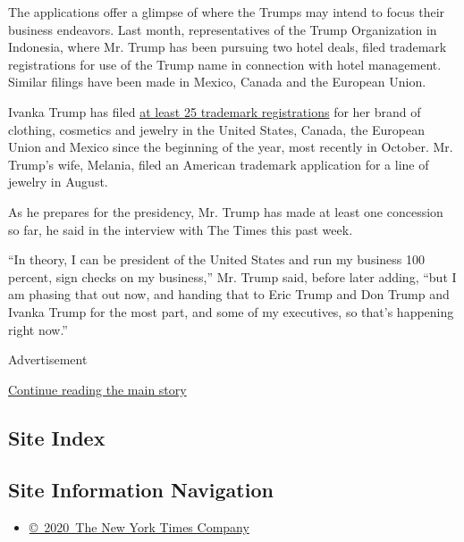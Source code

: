 The applications offer a glimpse of where the Trumps may intend to focus
their business endeavors. Last month, representatives of the Trump
Organization in Indonesia, where Mr. Trump has been pursuing two hotel
deals, filed trademark registrations for use of the Trump name in
connection with hotel management. Similar filings have been made in
Mexico, Canada and the European Union.

Ivanka Trump has filed
\href{https://trademarks.justia.com/owners/ivanka-trump-marks-llc-1365461/}{at
least 25 trademark registrations} for her brand of clothing, cosmetics
and jewelry in the United States, Canada, the European Union and Mexico
since the beginning of the year, most recently in October. Mr. Trump's
wife, Melania, filed an American trademark application for a line of
jewelry in August.

As he prepares for the presidency, Mr. Trump has made at least one
concession so far, he said in the interview with The Times this past
week.

``In theory, I can be president of the United States and run my business
100 percent, sign checks on my business,'' Mr. Trump said, before later
adding, ``but I am phasing that out now, and handing that to Eric Trump
and Don Trump and Ivanka Trump for the most part, and some of my
executives, so that's happening right now.''

Advertisement

\protect\hyperlink{after-bottom}{Continue reading the main story}

\hypertarget{site-index}{%
\subsection{Site Index}\label{site-index}}

\hypertarget{site-information-navigation}{%
\subsection{Site Information
Navigation}\label{site-information-navigation}}

\begin{itemize}
\tightlist
\item
  \href{https://help.nytimes.com/hc/en-us/articles/115014792127-Copyright-notice}{©~2020~The
  New York Times Company}
\end{itemize}

